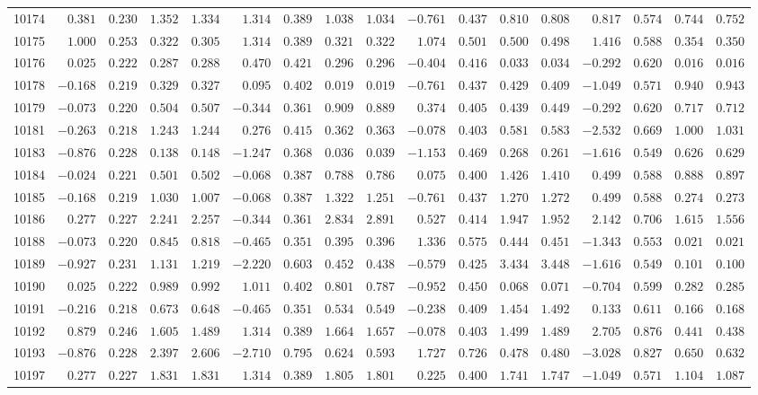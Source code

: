 \documentclass[6pt]{article}
\begin{document}
\begin{landscape}
{\begin{longtable}{lrrrrrrrrrrrrrrrr}
10174&$ 0.381$&$0.230$&$1.352$&$1.334$&$ 1.314$&$0.389$&$1.038$&$1.034$&$-0.761$&$0.437$&$0.810$&$0.808$&$ 0.817$&$0.574$&$0.744$&$0.752$\tabularnewline
10175&$ 1.000$&$0.253$&$0.322$&$0.305$&$ 1.314$&$0.389$&$0.321$&$0.322$&$ 1.074$&$0.501$&$0.500$&$0.498$&$ 1.416$&$0.588$&$0.354$&$0.350$\tabularnewline
10176&$ 0.025$&$0.222$&$0.287$&$0.288$&$ 0.470$&$0.421$&$0.296$&$0.296$&$-0.404$&$0.416$&$0.033$&$0.034$&$-0.292$&$0.620$&$0.016$&$0.016$\tabularnewline
10178&$-0.168$&$0.219$&$0.329$&$0.327$&$ 0.095$&$0.402$&$0.019$&$0.019$&$-0.761$&$0.437$&$0.429$&$0.409$&$-1.049$&$0.571$&$0.940$&$0.943$\tabularnewline
10179&$-0.073$&$0.220$&$0.504$&$0.507$&$-0.344$&$0.361$&$0.909$&$0.889$&$ 0.374$&$0.405$&$0.439$&$0.449$&$-0.292$&$0.620$&$0.717$&$0.712$\tabularnewline
10181&$-0.263$&$0.218$&$1.243$&$1.244$&$ 0.276$&$0.415$&$0.362$&$0.363$&$-0.078$&$0.403$&$0.581$&$0.583$&$-2.532$&$0.669$&$1.000$&$1.031$\tabularnewline
10183&$-0.876$&$0.228$&$0.138$&$0.148$&$-1.247$&$0.368$&$0.036$&$0.039$&$-1.153$&$0.469$&$0.268$&$0.261$&$-1.616$&$0.549$&$0.626$&$0.629$\tabularnewline
10184&$-0.024$&$0.221$&$0.501$&$0.502$&$-0.068$&$0.387$&$0.788$&$0.786$&$ 0.075$&$0.400$&$1.426$&$1.410$&$ 0.499$&$0.588$&$0.888$&$0.897$\tabularnewline
10185&$-0.168$&$0.219$&$1.030$&$1.007$&$-0.068$&$0.387$&$1.322$&$1.251$&$-0.761$&$0.437$&$1.270$&$1.272$&$ 0.499$&$0.588$&$0.274$&$0.273$\tabularnewline
10186&$ 0.277$&$0.227$&$2.241$&$2.257$&$-0.344$&$0.361$&$2.834$&$2.891$&$ 0.527$&$0.414$&$1.947$&$1.952$&$ 2.142$&$0.706$&$1.615$&$1.556$\tabularnewline
10188&$-0.073$&$0.220$&$0.845$&$0.818$&$-0.465$&$0.351$&$0.395$&$0.396$&$ 1.336$&$0.575$&$0.444$&$0.451$&$-1.343$&$0.553$&$0.021$&$0.021$\tabularnewline
10189&$-0.927$&$0.231$&$1.131$&$1.219$&$-2.220$&$0.603$&$0.452$&$0.438$&$-0.579$&$0.425$&$3.434$&$3.448$&$-1.616$&$0.549$&$0.101$&$0.100$\tabularnewline
10190&$ 0.025$&$0.222$&$0.989$&$0.992$&$ 1.011$&$0.402$&$0.801$&$0.787$&$-0.952$&$0.450$&$0.068$&$0.071$&$-0.704$&$0.599$&$0.282$&$0.285$\tabularnewline
10191&$-0.216$&$0.218$&$0.673$&$0.648$&$-0.465$&$0.351$&$0.534$&$0.549$&$-0.238$&$0.409$&$1.454$&$1.492$&$ 0.133$&$0.611$&$0.166$&$0.168$\tabularnewline
10192&$ 0.879$&$0.246$&$1.605$&$1.489$&$ 1.314$&$0.389$&$1.664$&$1.657$&$-0.078$&$0.403$&$1.499$&$1.489$&$ 2.705$&$0.876$&$0.441$&$0.438$\tabularnewline
10193&$-0.876$&$0.228$&$2.397$&$2.606$&$-2.710$&$0.795$&$0.624$&$0.593$&$ 1.727$&$0.726$&$0.478$&$0.480$&$-3.028$&$0.827$&$0.650$&$0.632$\tabularnewline
10197&$ 0.277$&$0.227$&$1.831$&$1.831$&$ 1.314$&$0.389$&$1.805$&$1.801$&$ 0.225$&$0.400$&$1.741$&$1.747$&$-1.049$&$0.571$&$1.104$&$1.087$\tabularnewline

\end{longtable}}
\end{landscape}
\end{document}
